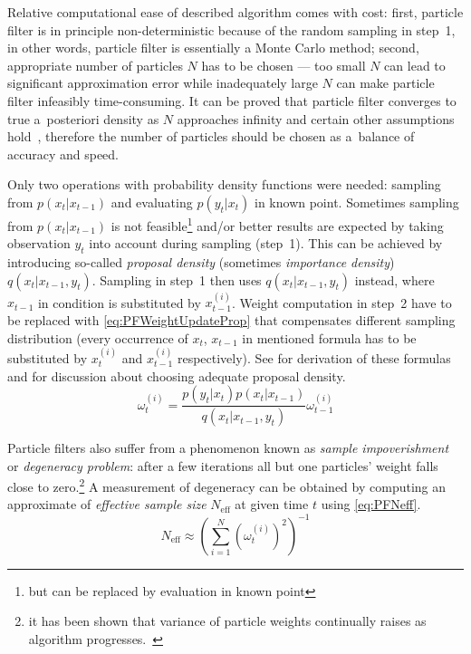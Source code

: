 \documentclass[a4paper,12pt,oneside]{report}
\newcommand{\pdfs}{probability density functions}
\begin{document}
Relative computational ease of described algorithm comes with
cost: first, particle filter is in principle non-deterministic because of the random sampling in
step~1, in other words, particle filter is essentially a Monte Carlo method; second, appropriate
number of particles \(N\) has to be chosen --- too small \(N\) can lead to significant approximation
error while inadequately large \(N\) can make particle filter infeasibly time-consuming. It can be
proved that particle filter converges to true a~posteriori density as \(N\) approaches
infinity and certain other assumptions hold~\cite{CriDou:02}, therefore the number of particles
should be chosen as a~balance of accuracy and speed.

Only two operations with {\pdfs} were needed: sampling from \(p(x_t|x_{t-1})\) and evaluating
\(p(y_t | x_t)\) in known point. Sometimes sampling from \(p(x_t|x_{t-1})\) is not
feasible\footnote{but can be replaced by evaluation in known point} and/or better results are
expected by taking observation \(y_t\) into account during sampling (step~1). This can be
achieved by introducing so-called \emph{proposal density} (sometimes \emph{importance density})
\(q(x_t|x_{t-1}, y_t)\). Sampling in step~1 then uses \(q(x_t|x_{t-1}, y_t)\) instead, where \(x_{t-1}\) in
condition is substituted by \(x_{t-1}^{(i)}\). Weight computation in step~2 have to be replaced with
\eqref{eq:PFWeightUpdateProp} that compensates different sampling distribution (every occurrence of
\(x_t\), \(x_{t-1}\) in mentioned formula has to be substituted by \(x_t^{(i)}\) and \(x_{t-1}^{(i)}\)
respectively). See \cite{AruMasGor:02} for derivation of these formulas and for discussion about
choosing adequate proposal density.
\begin{equation} \label{eq:PFWeightUpdateProp}
	\omega_t^{(i)} = \frac{p(y_t|x_t)p(x_t|x_{t-1})}{q(x_t|x_{t-1}, y_t)} \omega_{t-1}^{(i)}
\end{equation}

Particle filters also suffer from a phenomenon known as \emph{sample impoverishment} or
\emph{degeneracy problem}: after a few iterations all but one particles' weight falls close to
zero.\footnote{it has been shown that variance of particle weights continually raises as algorithm
progresses.~\cite{AruMasGor:02}} A measurement of degeneracy can be obtained by computing an
approximate of \emph{effective sample size} \(N_{\text{eff}}\) at given time \(t\) using
\eqref{eq:PFNeff}.~\cite{AruMasGor:02}
\begin{equation} \label{eq:PFNeff}
	N_{\text{eff}} \approx \left( \sum_{i=1}^N \left( \omega_t^{(i)} \right)^2 \right)^{-1}
\end{equation}
\end{document}

